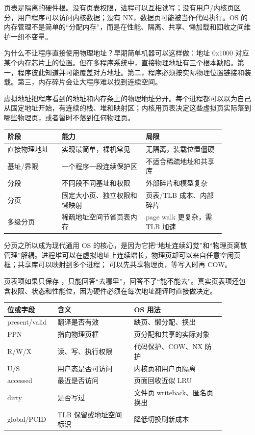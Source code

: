 页表是隔离的硬件根。没有页表权限，进程可以互相读写；没有用户/内核页区分，用户程序可以访问内核数据；没有 NX，数据页可能被当作代码执行。OS 的内存管理不是简单的“分配内存”，而是在性能、隔离、共享、懒加载和回收之间维护一组不变量。

为什么不让程序直接使用物理地址？早期简单机器可以这样做：地址 0x1000 对应某个内存芯片上的位置。但在多程序系统中，直接物理地址有三个根本缺陷。第一，程序彼此知道并可能覆盖对方地址。第二，程序必须按实际物理位置链接和装载。第三，内存碎片会让大程序难以找到连续空间。

虚拟地址把程序看到的地址和内存条上的物理地址分开。每个进程都可以以为自己从固定地址开始，有连续的栈、堆和映射区；内核用页表决定这些虚拟页实际落到哪些物理页，或者暂时不落到任何物理页。

\begin{longtable}{p{0.22\linewidth}p{0.34\linewidth}p{0.32\linewidth}}
\toprule
阶段 & 能力 & 局限 \\
\midrule
直接物理地址 & 实现最简单，裸机常见 & 无隔离，装载位置僵硬 \\
基址/界限 & 一个程序一段连续保护区 & 不适合稀疏地址和共享库 \\
分段 & 不同段不同基址和权限 & 外部碎片和模型复杂 \\
分页 & 固定大小页、独立权限和懒映射 & 页表/TLB 成本、内部碎片 \\
多级分页 & 稀疏地址空间节省页表内存 & page walk 更复杂，需 TLB 加速 \\
\bottomrule
\end{longtable}

分页之所以成为现代通用 OS 的核心，是因为它把“地址连续幻觉”和“物理页离散管理”解耦。进程堆可以在虚拟地址上连续增长，物理页却可以来自任意空闲页框；共享库可以映射到多个进程； 可以先共享物理页，等写入时再 COW。

页表项如果只保存 ，只能回答“去哪里”，回答不了“能不能去”。真实页表项还包含权限、状态和性能位，因为硬件必须在每次地址翻译时直接做决定。

\begin{longtable}{p{0.18\linewidth}p{0.32\linewidth}p{0.38\linewidth}}
\toprule
位或字段 & 含义 & OS 用法 \\
\midrule
present/valid & 翻译是否有效 & 缺页、懒分配、换出 \\
PPN & 指向物理页框 & 页分配和共享的实际对象 \\
R/W/X & 读、写、执行权限 & 代码保护、COW、NX 防护 \\
U/S & 用户态是否可访问 & 内核页和用户页隔离 \\
accessed & 最近是否访问 & 页面回收近似 LRU \\
dirty & 是否写过 & 文件页 writeback、匿名页换出 \\
global/PCID & TLB 保留或地址空间标识 & 降低切换刷新成本 \\
\bottomrule
\end{longtable}

